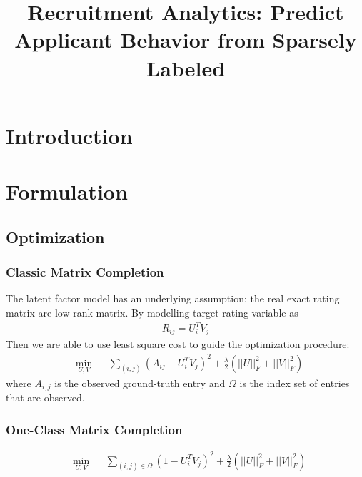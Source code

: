 \documentclass{article} %
\title{Recruitment Analytics: Predict Applicant Behavior from Sparsely Labeled }
\author{
}
\newtheorem{remark}{Remark}
\begin{document}
\maketitle

\section{Introduction}

\section{Formulation}
\subsection{Optimization}
\subsubsection{Classic Matrix Completion}
The latent factor model has an underlying assumption: the real exact rating matrix are
low-rank matrix. By modelling target rating variable as 
\begin{align}
    R_{ij} = U_i^T V_j 
\end{align}
Then we are able to use least square cost to guide the optimization procedure: 
\begin{equation}
    \begin{aligned}
        &\min_{U,V} 
        && \sum_{(i,j)} (A_{ij} - U_i^T V_j)^2
        + \frac{\lambda}{2}(||U||_F^2 + ||V||_F^2)
    \end{aligned}
\end{equation}
where $A_{i,j}$ is the observed ground-truth entry and $\Omega$ is the index set of
entries that are observed. 

\subsubsection{One-Class Matrix Completion}
\begin{equation}
    \begin{aligned}
        &\min_{U,V} 
        && \sum_{(i,j)\in \Omega} (1 - U_i^T V_j)^2
        + \frac{\lambda}{2}(||U||_F^2 + ||V||_F^2)
    \end{aligned}
\end{equation}
\end{document}
